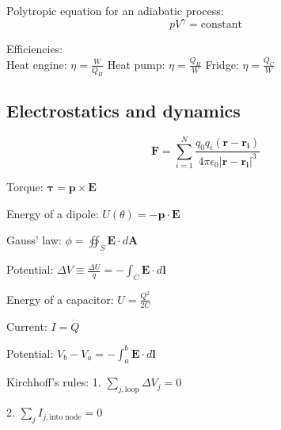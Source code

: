 \documentclass[12pt,a4paper]{article}
\begin{document}
Polytropic equation for an adiabatic process: \[ pV^\gamma = \text{constant} \]

Efficiencies:\\
Heat engine: \( \eta = \frac{W}{Q_H}\)
Heat pump: \( \eta = \frac{Q_H}{W}\)
Fridge: \( \eta = \frac{Q_C}{W}\)



\subsection*{Electrostatics and dynamics}
	\setlength{\parskip}{.8em} %
	
	\[
	\mathbf{F} = \sum_{i=1}^{N} \frac{q_0 q_i (\mathbf{r}-\mathbf{r_i})}{4\pi \epsilon_0 |\mathbf{r}-\mathbf{r_i}|^3}
	\]
	
	Torque: \( \mathbf{\tau} = \mathbf{p} \times \mathbf{E} \)
	
	Energy of a dipole: \( U(\theta) = -\mathbf{p} \cdot \mathbf{E} \)
	
	Gauss' law: \( \phi = \oiint_{S} \mathbf{E} \cdot d\mathbf{A} \)
	
	Potential: \( \Delta V \equiv \frac{\Delta U}{q} = - \int_{C} \mathbf{E} \cdot d\mathbf{l} \)
	
	Energy of a capacitor: \( U = \frac{Q^2}{2C} \)
	
	Current: \( I = \dot{Q} \)
	
	Potential: \( V_b - V_a = -\int_{a}^{b} \mathbf{E} \cdot d\mathbf{l} \)
	
	Kirchhoff's rules:
	1. \( \sum_{j, \text{loop}} \Delta V_j = 0 \)
	2. \( \sum_{j} I_{j, \text{into node}} = 0 \)
\end{document}
